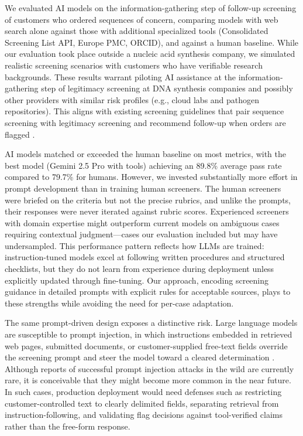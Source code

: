 \documentclass[12pt]{article}
\begin{document}
We evaluated AI models on the information-gathering step of follow-up screening of customers who ordered sequences of concern, comparing models with web search alone against those with additional specialized tools (Consolidated Screening List API, Europe PMC, ORCID), and against a human baseline. While our evaluation took place outside a nucleic acid synthesis company, we simulated realistic screening scenarios with customers who have verifiable research backgrounds. These results warrant piloting AI assistance at the information-gathering step of legitimacy screening at DNA synthesis companies and possibly other providers with similar risk profiles (e.g., cloud labs and pathogen repositories). This aligns with existing screening guidelines that pair sequence screening with legitimacy screening and recommend follow-up when orders are flagged \citep{HHS2023, IGSC2024}.

AI models matched or exceeded the human baseline on most metrics, with the best model (Gemini 2.5 Pro with tools) achieving an 89.8\% average pass rate compared to 79.7\% for humans. However, we invested substantially more effort in prompt development than in training human screeners. The human screeners were briefed on the criteria but not the precise rubrics, and unlike the prompts, their responses were never iterated against rubric scores. Experienced screeners with domain expertise might outperform current models on ambiguous cases requiring contextual judgment—cases our evaluation included but may have undersampled. This performance pattern reflects how LLMs are trained: instruction-tuned models excel at following written procedures and structured checklists, but they do not learn from experience during deployment unless explicitly updated through fine-tuning. Our approach, encoding screening guidance in detailed prompts with explicit rules for acceptable sources, plays to these strengths while avoiding the need for per-case adaptation.

The same prompt-driven design exposes a distinctive risk. Large language models are susceptible to prompt injection, in which instructions embedded in retrieved web pages, submitted documents, or customer-supplied free-text fields override the screening prompt and steer the model toward a cleared determination \citep{Greshake2023, Zhan2024}. Although reports of successful prompt injection attacks in the wild are currently rare, it is conceivable that they might become more common in the near future. In such cases, production deployment would need defenses such as restricting customer-controlled text to clearly delimited fields, separating retrieval from instruction-following, and validating flag decisions against tool-verified claims rather than the free-form response.
\end{document}
